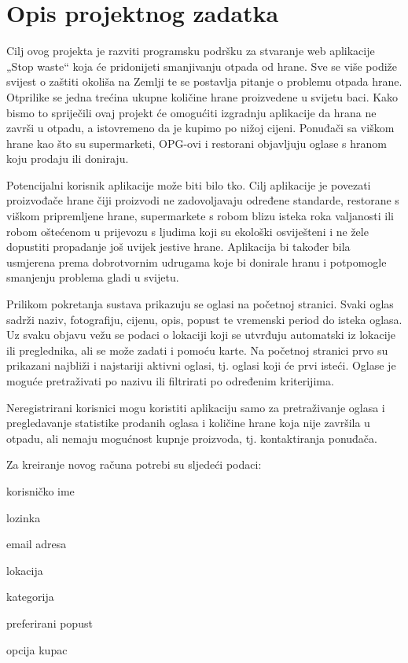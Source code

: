 \chapter{Opis projektnog zadatka}
		
		 
		
		Cilj ovog projekta je razviti programsku podršku za stvaranje web aplikacije „Stop waste“ koja će pridonijeti smanjivanju otpada od hrane. Sve se više podiže svijest o zaštiti okoliša na Zemlji te se postavlja pitanje o problemu otpada hrane.  Otprilike se jedna trećina ukupne količine hrane proizvedene u svijetu baci. Kako bismo to spriječili ovaj projekt će omogućiti izgradnju aplikacije da hrana ne završi u otpadu, a istovremeno da je kupimo po nižoj cijeni. Ponuđači sa viškom hrane kao što su supermarketi, OPG-ovi i restorani objavljuju oglase s hranom koju prodaju ili doniraju. 
		
		Potencijalni korisnik aplikacije može biti bilo tko. Cilj aplikacije je povezati proizvođače hrane čiji proizvodi ne zadovoljavaju određene standarde, restorane s viškom pripremljene hrane, supermarkete s robom blizu isteka roka valjanosti ili robom oštećenom u prijevozu s ljudima koji su ekološki osviješteni i ne žele dopustiti propadanje još uvijek jestive hrane. Aplikacija bi također bila usmjerena prema dobrotvornim udrugama koje bi donirale hranu i potpomogle smanjenju problema gladi u svijetu.    
		
		Prilikom pokretanja sustava prikazuju se oglasi na početnoj stranici. Svaki oglas sadrži naziv, fotografiju, cijenu, opis, popust te vremenski period do isteka oglasa. Uz svaku objavu vežu se podaci o lokaciji koji se utvrđuju automatski iz lokacije ili preglednika, ali se može zadati i pomoću karte. Na početnoj stranici prvo su prikazani najbliži i  najstariji aktivni oglasi, tj. oglasi koji će prvi isteći. Oglase je moguće pretraživati po nazivu ili filtrirati po određenim kriterijima. 
		
		Neregistrirani korisnici mogu koristiti aplikaciju samo za pretraživanje oglasa i pregledavanje statistike prodanih oglasa i količine hrane koja nije završila u otpadu, ali nemaju mogućnost kupnje proizvoda, tj. kontaktiranja ponuđača. 
		
\noindent Za kreiranje novog računa potrebi su sljedeći podaci: 
		 
		
	
			\begin{packed_item}
			
			\item  korisničko ime 
			\item  lozinka 
			\item  email adresa 
			\item lokacija
			\item kategorija
			\item preferirani popust
			\item opcija kupac
			
			\end{packed_item}
	
